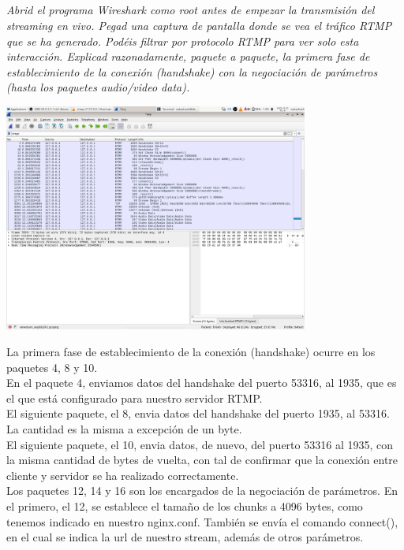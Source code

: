 \documentclass[spanish]{article}
\begin{document}
\subsection{}

\textit{Abrid el programa Wireshark como root antes de
empezar la transmisión del streaming en vivo. Pegad una
captura de pantalla donde se vea el tráfico RTMP que se ha
generado. Podéis filtrar por protocolo RTMP para ver solo
esta interacción. Explicad razonadamente, paquete a paquete,
la primera fase de establecimiento de la conexión
(handshake) con la negociación de parámetros (hasta los
paquetes audio/video data).}\\

\begin{center}
\includegraphics[width=10cm]{../img/10.png}
\end{center}

La primera fase de establecimiento de la conexión
(handshake) ocurre en los paquetes 4, 8 y 10.\\

En el paquete 4, enviamos datos del handshake del puerto
53316, al 1935, que es el que está configurado para nuestro
servidor RTMP.\\

El siguiente paquete, el 8, envia datos del handshake del
puerto 1935, al 53316. La cantidad es la misma a excepción
de un byte.\\

El siguiente paquete, el 10, envia datos, de nuevo, del
puerto 53316 al 1935, con la misma cantidad de bytes de
vuelta, con tal de confirmar que la conexión entre cliente y
servidor se ha realizado correctamente.\\

Los paquetes 12, 14 y 16 son los encargados de la
negociación de parámetros. En el primero, el 12, se
establece el tamaño de los chunks a 4096 bytes, como tenemos
indicado en nuestro nginx.conf. También se envía el comando
connect(), en el cual se indica la url de nuestro stream,
además de otros parámetros.\\
\end{document}
